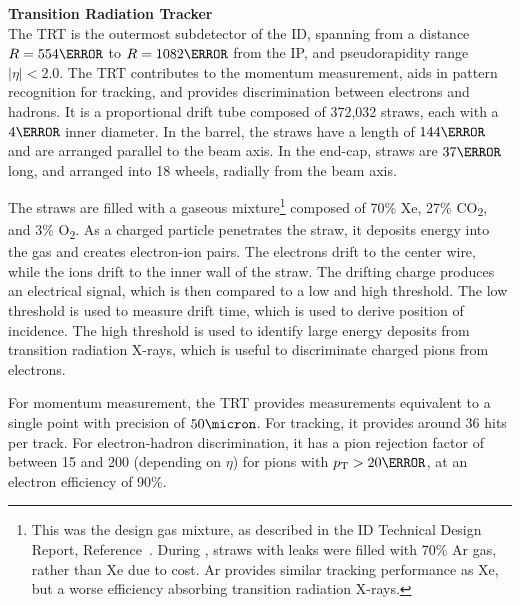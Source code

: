 \noindent\textbf{Transition Radiation Tracker}\\
\indent The \gls{TRT} is the outermost subdetector of the \gls{ID}, spanning from a distance $R=\unit{554}{\mm}$ to $R= \unit{1082}{\mm}$ from the \gls{IP}, and pseudorapidity range $|\eta| < 2.0$. The \gls{TRT} contributes to the momentum measurement, aids in pattern recognition for tracking, and provides discrimination between electrons and hadrons. It is a proportional drift tube composed of 372,032 straws, each with a $\unit{4}{\mm}$ inner diameter. In the barrel, the straws have a length of $\unit{144}{\cm}$ and are arranged parallel to the beam axis. In the end-cap, straws are $\unit{37}{\cm}$ long, and arranged into 18 wheels, radially from the beam axis.

The straws are filled with a gaseous mixture\footnote{This was the design gas mixture, as described in the \gls{ID} Technical Design Report, Reference~\cite{inner-detector-tdr}. During \RunTwo, straws with leaks were filled with 70\% Ar gas, rather than Xe due to cost. Ar provides similar tracking performance as Xe, but a worse efficiency absorbing transition radiation X-rays.} composed of 70\% Xe, 27\% CO\textsubscript{2}, and 3\% O\textsubscript{2}. As a charged particle penetrates the straw, it deposits energy into the gas and creates electron-ion pairs. The electrons drift to the center wire, while the ions drift to the inner wall of the straw. The drifting charge produces an electrical signal, which is then compared to a low and high threshold. The low threshold is used to measure drift time, which is used to derive position of incidence. The high threshold is used to identify large energy deposits from transition radiation X-rays, which is useful to discriminate charged pions from electrons.

For momentum measurement, the \gls{TRT} provides measurements equivalent to a single point with precision of $\unit{50}{\micron}$. For tracking, it provides around 36 hits per track. For electron-hadron discrimination, it has a pion rejection factor of between 15 and 200 (depending on $\eta$) for pions with $\pt > \unit{20}{\GeV}$, at an electron efficiency of 90\%.


